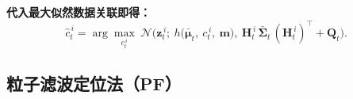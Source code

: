 \documentclass[../main.tex]{subfiles}
\begin{document}
\begin{enumerate}
\begin{itemize}
{{\noindent\textbf{代入最大似然数据关联即得：}
\[
\hat{c}_t^{\,i}
= \arg\max_{c_t^{\,i}}
\; \mathcal{N}\!\Big(
\mathbf{z}_t^{\,i};\ h\!\big(\bar{\boldsymbol{\mu}}_t,\ c_t^{\,i},\ \mathbf{m}\big),
\ \mathbf{H}_t^{\,i}\,\bar{\boldsymbol{\Sigma}}_t\,(\mathbf{H}_t^{\,i})^\top + \mathbf{Q}_t
\Big).
\]
    
    
        }}

    \end{itemize}
    
    
\end{enumerate}
\subsection{粒子滤波定位法（PF）}
\end{document}
